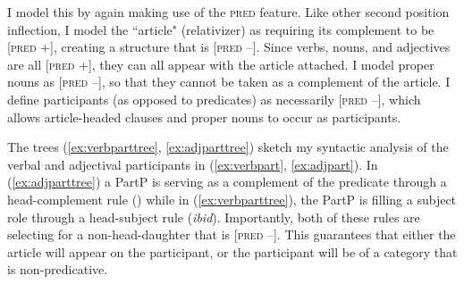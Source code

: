 I model this by again making use of the \textsc{pred} feature. Like other second position inflection, I model the ``article" (relativizer) as requiring its complement to be [\textsc{pred} +], creating a structure that is [\textsc{pred} --]. Since verbs, nouns, and adjectives are all [\textsc{pred} +], they can all appear with the article attached. I model proper nouns as [\textsc{pred} --], so that they cannot be taken as a complement of the article. I define participants (as opposed to predicates) as necessarily [\textsc{pred} --], which allows article-headed clauses and proper nouns to occur as participants.

The trees (\ref{ex:verbparttree}, \ref{ex:adjparttree}) sketch my syntactic analysis of the verbal and adjectival participants in (\ref{ex:verbpart}, \ref{ex:adjpart}). In (\ref{ex:adjparttree}) a PartP is serving as a complement of the predicate through a head-complement rule (\citealt{bender2002, pollardsag1994}) while in (\ref{ex:verbparttree}), the PartP is filling a subject role through a head-subject rule (\textit{ibid}). Importantly, both of these rules are selecting for a non-head-daughter that is [\textsc{pred} --]. This guarantees that either the article will appear on the participant, or the participant will be of a category that is non-predicative.


